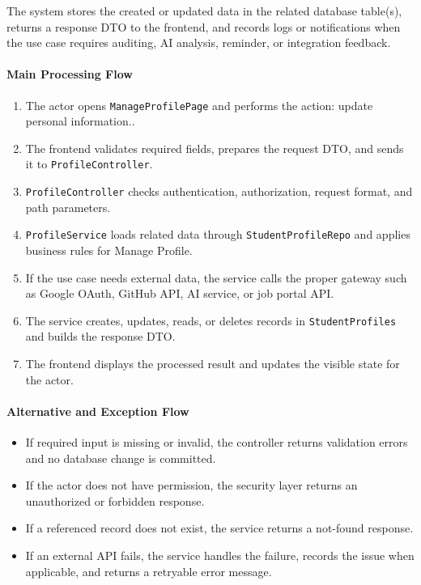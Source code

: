 The system stores the created or updated data in the related database table(s), returns a response DTO to the frontend, and records logs or notifications when the use case requires auditing, AI analysis, reminder, or integration feedback.

\paragraph{Main Processing Flow}

\begin{enumerate}
    \item The actor opens \texttt{ManageProfilePage} and performs the action: update personal information..
    \item The frontend validates required fields, prepares the request DTO, and sends it to \texttt{ProfileController}.
    \item \texttt{ProfileController} checks authentication, authorization, request format, and path parameters.
    \item \texttt{ProfileService} loads related data through \texttt{StudentProfileRepo} and applies business rules for Manage Profile.
    \item If the use case needs external data, the service calls the proper gateway such as Google OAuth, GitHub API, AI service, or job portal API.
    \item The service creates, updates, reads, or deletes records in \texttt{StudentProfiles} and builds the response DTO.
    \item The frontend displays the processed result and updates the visible state for the actor.
\end{enumerate}

\paragraph{Alternative and Exception Flow}

\begin{itemize}
    \item If required input is missing or invalid, the controller returns validation errors and no database change is committed.
    \item If the actor does not have permission, the security layer returns an unauthorized or forbidden response.
    \item If a referenced record does not exist, the service returns a not-found response.
    \item If an external API fails, the service handles the failure, records the issue when applicable, and returns a retryable error message.
\end{itemize}

